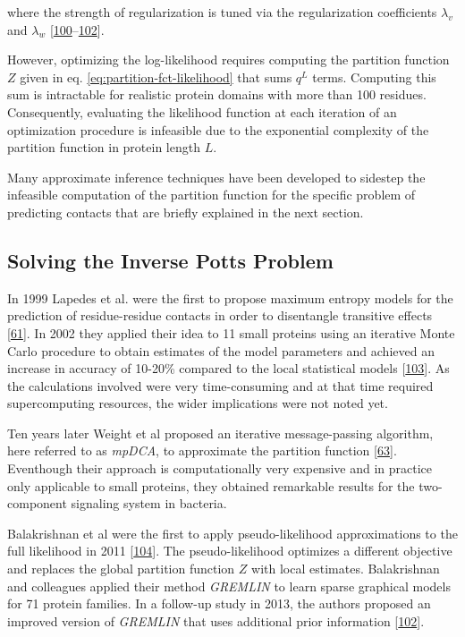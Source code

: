 \documentclass[11pt,a4paper,twoside]{book}
\theoremstyle{definition}
\theoremstyle{definition}
\theoremstyle{remark}
\begin{document}
where the strength of regularization is tuned via the regularization
coefficients \(\lambda_v\) and \(\lambda_w\)
{[}\protect\hyperlink{ref-Seemayer2014}{100}--\protect\hyperlink{ref-Kamisetty2013}{102}{]}.

However, optimizing the log-likelihood requires computing the partition
function \(Z\) given in eq. \eqref{eq:partition-fct-likelihood} that sums
\(q^L\) terms. Computing this sum is intractable for realistic protein
domains with more than 100 residues. Consequently, evaluating the
likelihood function at each iteration of an optimization procedure is
infeasible due to the exponential complexity of the partition function
in protein length \(L\).

Many approximate inference techniques have been developed to sidestep
the infeasible computation of the partition function for the specific
problem of predicting contacts that are briefly explained in the next
section.

\subsection{Solving the Inverse Potts
Problem}\label{potts-model-solutions}

In 1999 Lapedes et al. were the first to propose maximum entropy models
for the prediction of residue-residue contacts in order to disentangle
transitive effects {[}\protect\hyperlink{ref-Lapedes1999}{61}{]}. In
2002 they applied their idea to 11 small proteins using an iterative
Monte Carlo procedure to obtain estimates of the model parameters and
achieved an increase in accuracy of 10-20\% compared to the local
statistical models {[}\protect\hyperlink{ref-Lapedes2012a}{103}{]}. As
the calculations involved were very time-consuming and at that time
required supercomputing resources, the wider implications were not noted
yet.

Ten years later Weight et al proposed an iterative message-passing
algorithm, here referred to as \emph{mpDCA}, to approximate the
partition function {[}\protect\hyperlink{ref-Weigt2009}{63}{]}.
Eventhough their approach is computationally very expensive and in
practice only applicable to small proteins, they obtained remarkable
results for the two-component signaling system in bacteria.

Balakrishnan et al were the first to apply pseudo-likelihood
approximations to the full likelihood in 2011
{[}\protect\hyperlink{ref-Balakrishnan2011}{104}{]}. The
pseudo-likelihood optimizes a different objective and replaces the
global partition function \(Z\) with local estimates. Balakrishnan and
colleagues applied their method \emph{GREMLIN} to learn sparse graphical
models for 71 protein families. In a follow-up study in 2013, the
authors proposed an improved version of \emph{GREMLIN} that uses
additional prior information
{[}\protect\hyperlink{ref-Kamisetty2013}{102}{]}.
\end{document}
